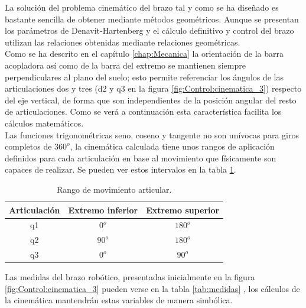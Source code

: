     La solución del problema cinemático del brazo tal y como se ha diseñado es bastante sencilla de obtener mediante métodos geométricos. Aunque se presentan los parámetros de Denavit-Hartenberg y el cálculo definitivo y control del brazo utilizan las relaciones obtenidas mediante relaciones geométricas.
    \\
    
    Como se ha descrito en el capítulo \ref{chap:Mecanica} la orientación de la barra acopladora así como de la barra del extremo se mantienen siempre perpendiculares al plano del suelo; esto permite referenciar los ángulos de las articulaciones dos y tres (d2 y q3 en la figura \ref{fig:Control:cinematica_3}) respecto del eje vertical, de forma que son independientes de la posición angular del resto de articulaciones. Como se verá a continuación esta característica facilita los cálculos matemáticos.
    \\
    
    Las funciones trigonométricas seno, coseno y tangente no son unívocas para giros completos de $360^o$, la cinemática calculada tiene unos rangos de aplicación definidos para cada articulación en base al movimiento que físicamente son capaces de realizar. Se pueden ver estos intervalos en la tabla \ref{tab:rangos_art}.
    
    \begin{table}[H]
    	\caption{Rango de movimiento articular.}
    	\label{tab:rangos_art}
    		\begin{center}
    			\begin{tabular}{ |c|c|c| }
    				\hline
    				\textbf{Articulación} & \textbf{Extremo inferior} & \textbf{Extremo superior}  \\
    				\hline
    				q1 & $0^o$ & $180^o$ \\
    				\hline
    				q2 & $90^o$ & $180^o$ \\
    				\hline
    				q3 & $0^o$ & $90^o$ \\
    				\hline
    			\end{tabular}
    		\end{center}
    \end{table}

	Las medidas del brazo robótico, presentadas inicialmente en la figura \ref{fig:Control:cinematica_3} pueden verse en la tabla \ref{tab:medidas} , los cálculos de la cinemática mantendrán estas variables de manera simbólica.
	

